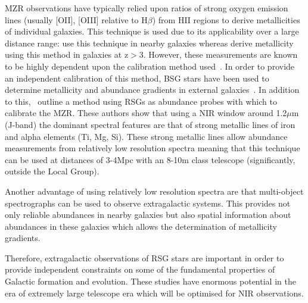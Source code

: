 MZR observations have typically relied upon ratios of strong oxygen emission lines (usually [OII], [OIII] relative to H$\beta$) from HII regions to derive metallicities of individual galaxies.
This technique is used due to its applicability over a large distance range:
\cite{Charlot01} use this technique in nearby galaxies whereas \cite{Maiolino08} derive metallicity using this method in galaxies at z$>$3.
However, these measurements are known to be highly dependent upon the calibration method used~\citep{Kewley08, Kudritzki08,Bresolin09}.
In order to provide an independent calibration of this method, BSG stars have been used to determine metallicity and abundance gradients in external galaxies~\citep{Kudritzki12}.
In addition to this,~\cite{Davies13b} outline a method using RSGs as abundance probes with which to calibrate the MZR.
These authors show that using a NIR window around 1.2$\mu$m (J-band) the dominant spectral features are that of strong metallic lines of iron and alpha elements (Ti, Mg, Si).
These strong metallic lines allow abundance measurements from relatively low resolution spectra meaning that this technique can be used at distances of 3-4Mpc with an 8-10m class telescope (significantly, outside the Local Group).


Another advantage of using relatively low resolution spectra are that multi-object spectrographs can be used to observe extragalactic systems.
This provides not only reliable abundances in nearby galaxies but also spatial information about abundances in these galaxies which allows the determination of metallicity gradients.

Therefore, extragalactic observations of RSG stars are important in order to provide independent constraints on some of the fundamental properties of Galactic formation and evolution.
These studies have enormous potential in the era of extremely large telescope era which will be optimised for NIR observations.


